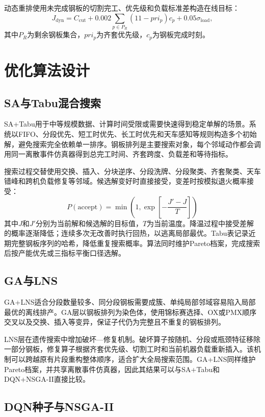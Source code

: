 \documentclass[UTF8,zihao=-4,openany]{ctexrep}
\begin{document}
动态重排使用未完成钢板的切割完工、优先级和负载标准差构造在线目标：
\begin{equation}
 J_{\mathrm{dyn}}
 =C_{\mathrm{cut}}
 +0.002\sum_{p\in P_R}(11-pri_p)c_p
 +0.05\sigma_{\mathrm{load}},
\end{equation}
其中$P_R$为剩余钢板集合，$pri_p$为齐套优先级，$c_p$为钢板完成时刻。

\chapter{优化算法设计}

\section{SA与Tabu混合搜索}

SA+Tabu用于中等规模数据、计算时间受限或需要快速得到稳定单解的场景。系统以FIFO、分段优先、短工时优先、长工时优先和天车感知等规则构造多个初始解，避免搜索完全依赖单一排序。钢板排列是主要搜索对象，每个邻域动作都会调用同一离散事件仿真器得到总完工时间、齐套跨度、负载差和等待指标。

搜索过程交替使用交换、插入、分块逆序、分段洗牌、分段聚类、齐套聚类、天车错峰和跨机负载修复等邻域。候选解变好时直接接受，变差时按模拟退火概率接受：
\begin{equation}
 P(\text{accept})=\min\left(1,\exp\left[-\frac{J'-J}{T}\right]\right)
\end{equation}
其中$J$和$J'$分别为当前解和候选解的目标值，$T$为当前温度。降温过程中接受差解的概率逐渐降低；连续多次无改善时执行回热，以逃离局部最优。Tabu表记录近期完整钢板序列的哈希，降低重复搜索概率\cite{sa,tabu}。算法同时维护Pareto档案，完成搜索后按产能优先或三指标平衡口径选解。

\section{GA与LNS}

GA+LNS适合分段数量较多、同分段钢板需要成簇、单纯局部邻域容易陷入局部最优的离线排产。GA层以钢板排列为染色体，使用锦标赛选择、OX或PMX顺序交叉以及交换、插入等变异，保证子代仍为完整且不重复的钢板排列。

LNS层在遗传搜索中增加破坏—修复机制。破坏算子按随机、分段或瓶颈特征移除一部分钢板，修复算子根据齐套优先级、切割工时和当前机器负载重新插入。该机制可以跨越原有片段重构整体顺序，适合扩大全局搜索范围。GA+LNS同样维护Pareto档案，并共享离散事件仿真器，因此其结果可以与SA+Tabu和DQN+NSGA-II直接比较。

\section{DQN种子与NSGA-II}
\end{document}
